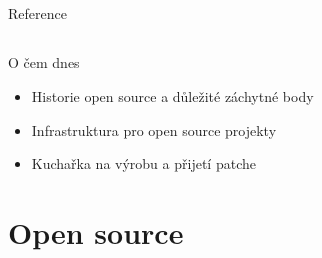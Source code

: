\documentclass{beamer}
\begin{document}
\subsection{}
\begin{frame}{Reference}
\end{frame}

\subsection{}
\begin{frame}{O čem dnes}
\begin{itemize}
\item Historie open source a důležité záchytné body
\item Infrastruktura pro open source projekty
\item Kuchařka na výrobu a přijetí patche
\end{itemize}
\end{frame}


\section{Open source}
\end{document}

